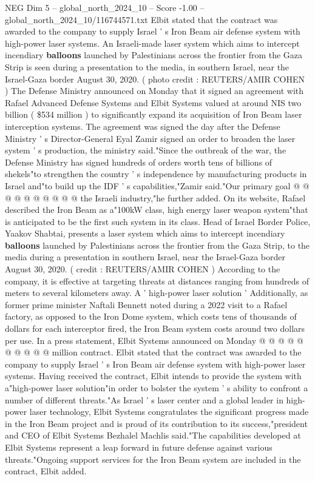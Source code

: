\begin{textsample}{NEG Dim 5 – global\_north\_2024\_10 – Score -1.00 – global\_north\_2024\_10/116744571.txt}  \label{ex:f5_neg_055}
Elbit stated that the contract was awarded to the company to supply Israel ' s Iron Beam air defense system with high-power laser systems.
An Israeli-made laser system which aims to intercept incendiary \textbf{balloons} launched by Palestinians across the frontier from the Gaza Strip is seen during a presentation to the media, in southern Israel, near the Israel-Gaza border August 30, 2020. ( photo credit : REUTERS/AMIR COHEN ) The Defense Ministry announced on Monday that it signed an agreement with Rafael Advanced Defense Systems and Elbit Systems valued at around NIS two billion ( \$534 million ) to significantly expand its acquisition of Iron Beam laser interception systems.
The agreement was signed the day after the Defense Ministry ' s Director-General Eyal Zamir signed an order to broaden the laser system ' s production, the ministry said."Since the outbreak of the war, the Defense Ministry has signed hundreds of orders worth tens of billions of shekels"to strengthen the country ' s independence by manufacturing products in Israel and"to build up the IDF ' s capabilities,"Zamir said."Our primary goal @ @ @ @ @ @ @ @ @ @ the Israeli industry,"he further added.
On its website, Rafael described the Iron Beam as a"100kW class, high energy laser weapon system"that is anticipated to be the first such system in its class.
Head of Israel Border Police, Yaakov Shabtai, presents a laser system which aims to intercept incendiary \textbf{balloons} launched by Palestinians across the frontier from the Gaza Strip, to the media during a presentation in southern Israel, near the Israel-Gaza border August 30, 2020. ( credit : REUTERS/AMIR COHEN ) According to the company, it is effective at targeting threats at distances ranging from hundreds of meters to several kilometers away.
A ' high-power laser solution ' Additionally, as former prime minister Naftali Bennett noted during a 2022 visit to a Rafael factory, as opposed to the Iron Dome system, which costs tens of thousands of dollars for each interceptor fired, the Iron Beam system costs around two dollars per use.
In a press statement, Elbit Systems announced on Monday @ @ @ @ @ @ @ @ @ @ million contract.
Elbit stated that the contract was awarded to the company to supply Israel ' s Iron Beam air defense system with high-power laser systems.
Having received the contract, Elbit intends to provide the system with a"high-power laser solution"in order to bolster the system ' s ability to confront a number of different threats."As Israel ' s laser center and a global leader in high-power laser technology, Elbit Systems congratulates the significant progress made in the Iron Beam project and is proud of its contribution to its success,"president and CEO of Elbit Systems Bezhalel Machlis said."The capabilities developed at Elbit Systems represent a leap forward in future defense against various threats."Ongoing support services for the Iron Beam system are included in the contract, Elbit added.

\end{textsample}
